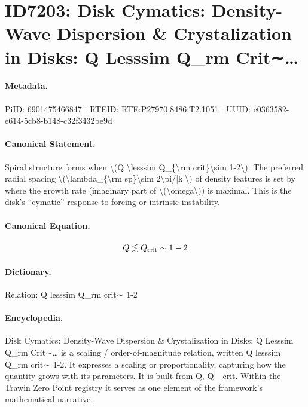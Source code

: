 \section*{ID7203: Disk Cymatics: Density-Wave Dispersion \& Crystalization in Disks: Q Lesssim Q\_rm Crit∼…}
\paragraph{Metadata.}
PiID: 6901475466847 | RTEID: RTE:P27970.8486:T2.1051 | UUID: c0363582-e614-5cb8-b148-c32f3432be9d

\paragraph{Canonical Statement.}
Spiral structure forms when \textbackslash{}(Q \textbackslash{}lesssim Q\_\{\textbackslash{}rm crit\}\textbackslash{}sim 1-2\textbackslash{}). The preferred radial spacing \textbackslash{}(\textbackslash{}lambda\_\{\textbackslash{}rm sp\}\textbackslash{}sim 2\textbackslash{}pi/|k|\textbackslash{}) of density features is set by where the growth rate (imaginary part of \textbackslash{}(\textbackslash{}omega\textbackslash{})) is maximal. This is the disk’s “cymatic” response to forcing or intrinsic instability.

\paragraph{Canonical Equation.}
\[
Q \lesssim Q_{\rm crit}\sim 1-2
\]

\paragraph{Dictionary.}
Relation: Q lesssim Q\_rm crit∼ 1-2

\paragraph{Encyclopedia.}
Disk Cymatics: Density-Wave Dispersion \& Crystalization in Disks: Q Lesssim Q\_rm Crit∼… is a scaling / order-of-magnitude relation, written Q lesssim Q\_rm crit∼ 1-2. It expresses a scaling or proportionality, capturing how the quantity grows with its parameters. It is built from Q, Q\_ crit. Within the Trawin Zero Point registry it serves as one element of the framework's mathematical narrative.

